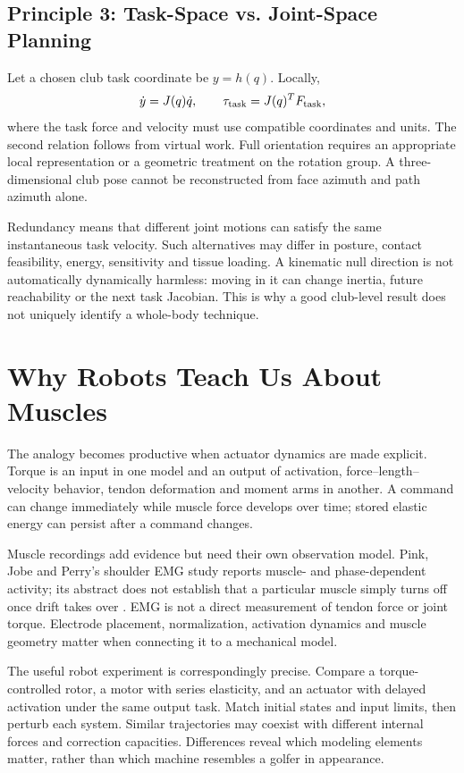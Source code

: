 \subsection{Principle 3: Task-Space vs. Joint-Space Planning}

Let a chosen club task coordinate be $y=h(q)$. Locally,
\[
\dot y=J(q)\dot q,\qquad \tau_{\rm task}=J(q)^TF_{\rm task},
\]
where the task force and velocity must use compatible coordinates and units. The second relation follows from virtual work. Full orientation requires an appropriate local representation or a geometric treatment on the rotation group. A three-dimensional club pose cannot be reconstructed from face azimuth and path azimuth alone.

Redundancy means that different joint motions can satisfy the same instantaneous task velocity. Such alternatives may differ in posture, contact feasibility, energy, sensitivity and tissue loading. A kinematic null direction is not automatically dynamically harmless: moving in it can change inertia, future reachability or the next task Jacobian. This is why a good club-level result does not uniquely identify a whole-body technique.

\section{Why Robots Teach Us About Muscles}
\label{laymans:ch13:robot_lesson}
\label{ex:ch13:supraspinatus}

The analogy becomes productive when actuator dynamics are made explicit. Torque is an input in one model and an output of activation, force--length--velocity behavior, tendon deformation and moment arms in another. A command can change immediately while muscle force develops over time; stored elastic energy can persist after a command changes.

Muscle recordings add evidence but need their own observation model. Pink, Jobe and Perry's shoulder EMG study reports muscle- and phase-dependent activity; its abstract does not establish that a particular muscle simply turns off once drift takes over \citep{Pink1990Shoulder}. EMG is not a direct measurement of tendon force or joint torque. Electrode placement, normalization, activation dynamics and muscle geometry matter when connecting it to a mechanical model.

The useful robot experiment is correspondingly precise. Compare a torque-controlled rotor, a motor with series elasticity, and an actuator with delayed activation under the same output task. Match initial states and input limits, then perturb each system. Similar trajectories may coexist with different internal forces and correction capacities. Differences reveal which modeling elements matter, rather than which machine resembles a golfer in appearance.


